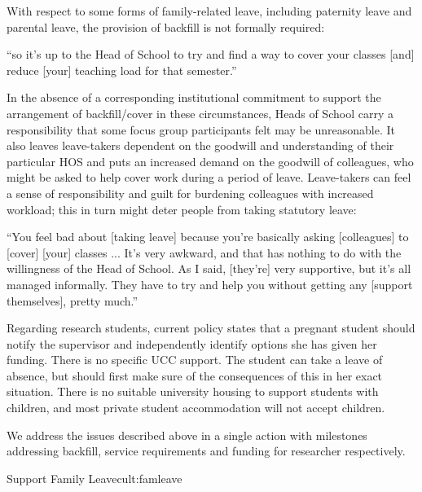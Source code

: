 With respect to some forms of family-related leave, including paternity leave and parental leave, the provision of backfill is not formally required:
\begin{myquote}
    ``so it's up to the Head of School to try and find a way to cover your classes [and] reduce [your] teaching load for that semester.''
\end{myquote}
In the absence of a corresponding institutional commitment to support the arrangement of backfill/cover in these circumstances, Heads of School carry a responsibility that some focus group participants felt may be unreasonable.  It also leaves leave-takers dependent on the goodwill and understanding of their particular \ac{HOS} and puts an increased demand on the goodwill of colleagues, who might be asked to help cover work during a period of leave.  
Leave-takers can feel a sense of responsibility and guilt for burdening colleagues with increased workload; this in turn might deter people from taking statutory leave:    


\begin{myquote}
“You feel bad about [taking leave] because you're basically asking [colleagues] to [cover] [your] classes ... It's very awkward, and that has nothing to do with the willingness of the Head of School. As I said, [they’re] very supportive, but it's all managed informally. They have to try and help you without getting any [support themselves], pretty much.”  
\end{myquote}

Regarding research students, current policy states that a pregnant student should notify the supervisor and independently identify options she has given her funding. There is no specific UCC support. 
The student can take a leave of absence, but should first make sure of the consequences of this in her exact situation. There is no suitable university housing to support students with children, and most private student accommodation will not accept children.  

We address the issues described above in a single action with milestones addressing backfill, service requirements and funding for researcher respectively.


\begin{actionblock}{\ksspace{}Support Family Leave}{cult:famleave}
\actremoveimpediments
\hfill{
    \hypersetup{hidelinks}
    \hyperlink{e5}{\gotoactionsymbol{}}
}
\end{actionblock}


